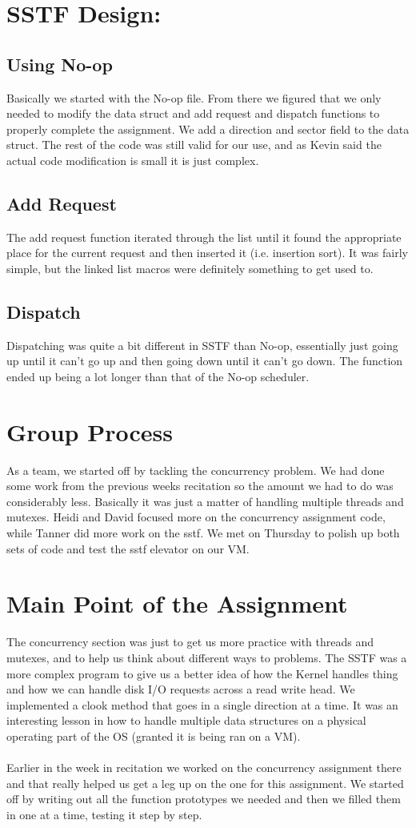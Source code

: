 \documentclass{article}
\begin{document}
\section*{SSTF Design:}
\subsection*{Using No-op}
Basically we started with the No-op file. From there we figured that we only needed to modify the data struct and add request and dispatch functions to properly complete the assignment. We add a direction and sector field to the data struct. The rest of the code was still valid for our use, and as Kevin said the actual code modification is small it is just complex.
\subsection*{Add Request}
The add request function iterated through the list until it found the appropriate place for the current request and then inserted it (i.e. insertion sort). It was fairly simple, but the linked list macros were definitely something to get used to.

\subsection*{Dispatch}
Dispatching was quite a bit different in SSTF than No-op, essentially just going up until it can't go up and then going down until it can't go down. The function ended up being a lot longer than that of the No-op scheduler.

\section{Group Process}
As a team, we started off by tackling the concurrency problem. We had done some work from the previous weeks recitation so the amount we had to do was considerably less. Basically it was just a matter of handling multiple threads and mutexes. Heidi and David focused more on the concurrency assignment code, while Tanner did more work on the sstf. We met on Thursday to polish up both sets of code and test the sstf elevator on our VM. 
\section{Main Point of the Assignment}
The concurrency section was just to get us more practice with threads and mutexes, and to help us think about different ways to problems. The SSTF was a more complex program to give us a better idea of how the Kernel handles thing and how we can handle disk I/O requests across a read write head. We implemented a clook method that goes in a single direction at a time. It was an interesting lesson in how to handle multiple data structures on a physical operating part of the OS (granted it is being ran on a VM). 
\\\\
Earlier in the week in recitation we worked on the concurrency assignment there and that really
helped us get a leg up on the one for this assignment. We started off by writing out all the
function prototypes we needed and then we filled them in one at a time, testing it step by step.
\end{document}
